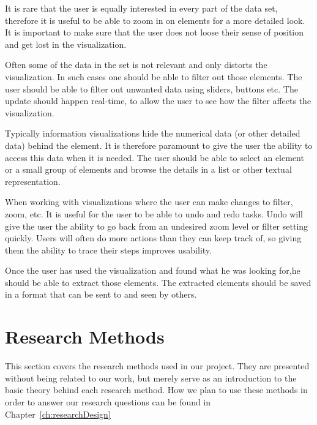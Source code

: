 It is rare that the user is equally interested in every part of the data set, therefore it is useful to be able to zoom in on elements for a more detailed look. It is important to make sure that the user does not loose their sense of position and get lost in the visualization.

Often some of the data in the set is not relevant and only distorts the visualization. In such cases one should be able to filter out those elements. The user should be able to filter out unwanted data using sliders, buttons etc. The update should happen real-time, to allow the user to see how the filter affects the visualization. 

Typically information visualizations hide the numerical data (or other detailed data) behind the element. It is therefore paramount to give the user the ability to access this data when it is needed. The user should be able to select an element or a small group of elements and browse the details in a list or other textual representation.

When working with visualizations where the user can make changes to filter, zoom, etc. It is useful for the user to be able to undo and redo tasks. Undo will give the user the ability to go back from an undesired zoom level or filter setting quickly. Users will often do more actions than they can keep track of, so giving them the ability to trace their steps improves usability.

Once the user has used the visualization and found what he was looking for,he should be able to extract those elements. The extracted elements should be saved in a format that can be sent to and seen by others. 

\section{Research Methods}
This section covers the research methods used in our project. They are presented without being related to our work, but merely serve as an introduction to the basic theory behind each research method. How we plan to use these methods in order to answer our research questions can be found in Chapter~\ref{ch:researchDesign}

